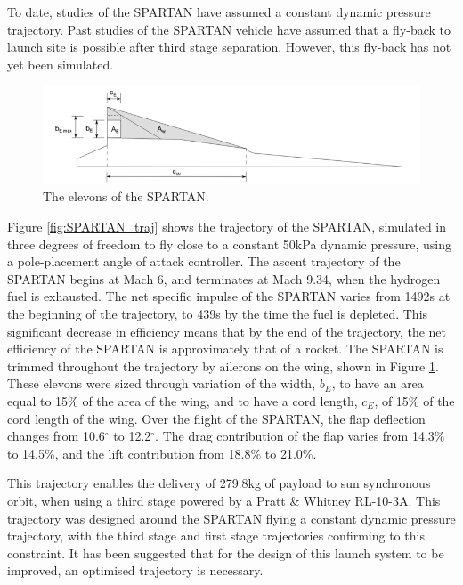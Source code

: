 To date, studies of the SPARTAN have assumed a constant dynamic pressure trajectory\cite{Preller2017b}.
Past studies of the SPARTAN vehicle have assumed that a fly-back to launch site is possible after third stage separation\cite{Preller2017b}. However, this fly-back has not yet been simulated. 
\begin{figure}[ht]
	\centering
	\includegraphics[width=0.7\linewidth]{figures/2_literature-review/SPARTANElevons}
	\caption{The elevons of the SPARTAN\cite{Preller2017b}.}
	\label{fig:SPARTANElevons}
\end{figure}
Figure \ref{fig:SPARTAN_traj} shows the trajectory of the SPARTAN, simulated in three degrees of freedom to fly close to a constant 50kPa dynamic pressure, using a pole-placement angle of attack controller\cite{Preller2017b}.
The ascent trajectory of the SPARTAN begins at Mach 6, and terminates at Mach 9.34, when the hydrogen fuel is exhausted\cite{Preller2017b}. 
The net specific impulse of the SPARTAN varies from 1492s at the beginning of the trajectory, to 439s by the time the fuel is depleted\cite{Preller2017b}. This significant decrease in efficiency means that by the end of the trajectory, the net efficiency of the SPARTAN is approximately that of a rocket\cite{Preller2017b}.
The SPARTAN is trimmed throughout the trajectory by ailerons on the wing, shown in Figure \ref{fig:SPARTANElevons}. These elevons were sized through variation of the width, $b_E$, to have an area equal to 15\% of the area of the wing, and to have a cord length, $c_E$, of 15\% of the cord length of the wing\cite{Preller2017b}. Over the flight of the SPARTAN, the flap deflection changes from 10.6$^\circ$ to 12.2$^\circ$\cite{Preller2017b}. The drag contribution of the flap varies from 14.3\% to 14.5\%, and the lift contribution from 18.8\% to 21.0\%\cite{Preller2018a}. 

This trajectory enables the delivery of 279.8kg of payload to sun synchronous orbit, when using a third stage powered by a Pratt \& Whitney RL-10-3A\cite{Preller2018a}. 
This trajectory was designed around the SPARTAN flying a constant dynamic pressure trajectory, with the third stage and first stage trajectories confirming to this constraint. It has been suggested that for the design of this launch system to be improved, an optimised trajectory is necessary\cite{Preller2017b}.


